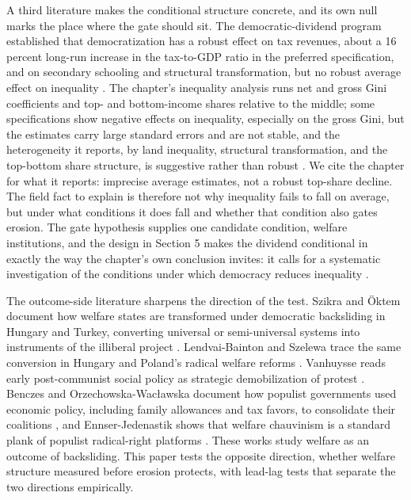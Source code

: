 A third literature makes the conditional structure concrete, and its own null marks the place where the gate should sit. The democratic-dividend program established that democratization has a robust effect on tax revenues, about a 16 percent long-run increase in the tax-to-GDP ratio in the preferred specification, and on secondary schooling and structural transformation, but no robust average effect on inequality \citep{AcemogluNaidu2015}. The chapter's inequality analysis runs net and gross Gini coefficients and top- and bottom-income shares relative to the middle; some specifications show negative effects on inequality, especially on the gross Gini, but the estimates carry large standard errors and are not stable, and the heterogeneity it reports, by land inequality, structural transformation, and the top-bottom share structure, is suggestive rather than robust \citep{AcemogluNaidu2015}. We cite the chapter for what it reports: imprecise average estimates, not a robust top-share decline. The field fact to explain is therefore not why inequality fails to fall on average, but under what conditions it does fall and whether that condition also gates erosion. The gate hypothesis supplies one candidate condition, welfare institutions, and the design in Section 5 makes the dividend conditional in exactly the way the chapter's own conclusion invites: it calls for a systematic investigation of the conditions under which democracy reduces inequality \citep{AcemogluNaidu2015}.

The outcome-side literature sharpens the direction of the test. Szikra and Öktem document how welfare states are transformed under democratic backsliding in Hungary and Turkey, converting universal or semi-universal systems into instruments of the illiberal project \citep{SzikraOktem2023}. Lendvai-Bainton and Szelewa trace the same conversion in Hungary and Poland's radical welfare reforms \citep{LendvaiBainton2021}. Vanhuysse reads early post-communist social policy as strategic demobilization of protest \citep{Vanhuysse2006}. Benczes and Orzechowska-Wacławska document how populist governments used economic policy, including family allowances and tax favors, to consolidate their coalitions \citep{Benczes2024}, and Ennser-Jedenastik shows that welfare chauvinism is a standard plank of populist radical-right platforms \citep{EnnserJedenastik2018}. These works study welfare as an outcome of backsliding. This paper tests the opposite direction, whether welfare structure measured before erosion protects, with lead-lag tests that separate the two directions empirically.

